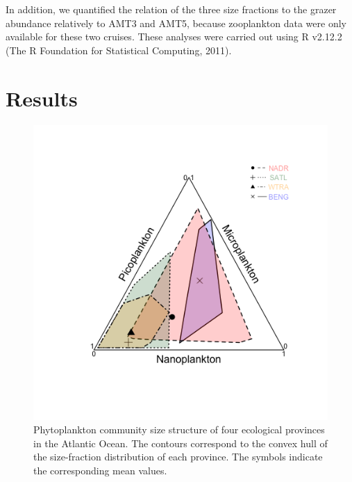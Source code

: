 In addition, we quantified the relation of the three size fractions to the grazer abundance relatively to AMT3 and AMT5, because zooplankton data were only available for these two cruises. These analyses were carried out using R v2.12.2 (The R Foundation for Statistical Computing, 2011).

\section{Results}

\begin{figure}
\centering
\includegraphics[trim = 20mm 30mm 20mm 20mm, clip, width=0.6\linewidth]{./Chp2-Pre/amt_4RegionsTriSizeFrac4.png}
\caption[Scheme]{\small {Phytoplankton community size structure of four ecological provinces in the Atlantic Ocean. The contours correspond to the convex hull of the size-fraction distribution of each province. The symbols indicate the corresponding mean values.}}
\label{RegSizeFrac}
\end{figure}

